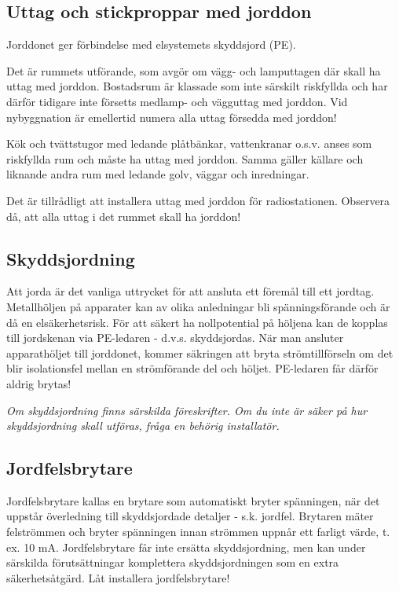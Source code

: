 \subsection{Uttag och stickproppar med jorddon}

Jorddonet ger förbindelse med elsystemets skyddsjord (PE).

Det är rummets utförande, som avgör om vägg- och lamputtagen där skall
ha uttag med jorddon. Bostadsrum är klassade som inte särskilt
riskfyllda och har därför tidigare inte försetts medlamp- och
vägguttag med jorddon. Vid nybyggnation är emellertid numera alla
uttag försedda med jorddon!

Kök och tvättstugor med ledande plåtbänkar, vattenkranar o.s.v. anses
som riskfyllda rum och måste ha uttag med jorddon.  Samma gäller
källare och liknande andra rum med ledande golv, väggar och
inredningar.

Det är tillrådligt att installera uttag med jorddon för
radiostationen. Observera då, att alla uttag i det rummet skall ha
jorddon!

\subsection{Skyddsjordning}

Att jorda är det vanliga uttrycket för att ansluta ett föremål till
ett jordtag. Metallhöljen på apparater kan av olika anledningar bli
spänningsförande och är då en elsäkerhetsrisk. För att säkert ha
nollpotential på höljena kan de kopplas till jordskenan via
PE-ledaren - d.v.s. skyddsjordas. När man ansluter apparathöljet till
jorddonet, kommer säkringen att bryta strömtillförseln om det blir
isolationsfel mellan en strömförande del och höljet. PE-ledaren får
därför aldrig brytas!

\emph{Om skyddsjordning finns särskilda föreskrifter. Om du inte är
  säker på hur skyddsjordning skall utföras, fråga en behörig
  installatör.}

\subsection{Jordfelsbrytare}

Jordfelsbrytare kallas en brytare som automatiskt bryter spänningen,
när det uppstår överledning till skyddsjordade detaljer -
s.k. jordfel.  Brytaren mäter felströmmen och bryter spänningen innan
strömmen uppnår ett farligt värde, t. ex. 10 mA. Jordfelsbrytare får
inte ersätta skyddsjordning, men kan under särskilda förutsättningar
komplettera skyddsjordningen som en extra säkerhetsåtgärd. Låt
installera jordfelsbrytare!

